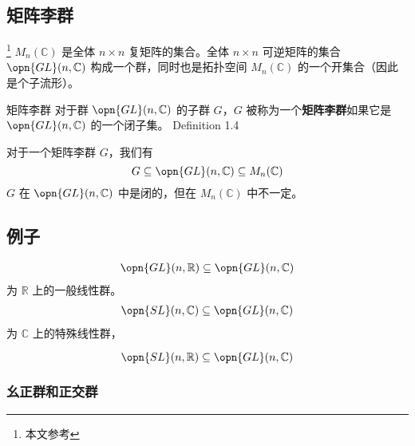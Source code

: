 
\begin{issues}
\issueDraft
\end{issues}


\subsection{矩阵李群}

\footnote{本文参考\cite{GTM222}} $M_n(\mathbb{C})$ 是全体 $n \times n$ 复矩阵的集合。全体 $n \times n$ 可逆矩阵的集合 $\opn{GL}(n, \mathbb{C})$ 构成一个群，同时也是拓扑空间 $M_n(\mathbb{C})$ 的一个开集合（因此是个子流形）。

\begin{definition}{矩阵李群}
对于群 $\opn{GL}(n, \mathbb{C})$ 的子群 $G$，$G$ 被称为一个\textbf{矩阵李群}如果它是 $\opn{GL}(n, \mathbb{C})$ 的一个闭子集。 Definition 1.4 \cite{GTM222} 
\end{definition}

对于一个矩阵李群 $G$，我们有
$$
G \subseteq \opn{GL}(n, \mathbb{C}) \subseteq M_n(\mathbb{C})
$$
$G$ 在 $\opn{GL}(n, \mathbb{C})$ 中是闭的，但在 $M_n(\mathbb{C})$ 中不一定。

\subsection{例子}

\begin{example}{}
\begin{equation}
\begin{aligned}
\opn{GL}(n, \mathbb{R}) \subseteq \opn{GL}(n, \mathbb{C})
\end{aligned}
\end{equation}
为 $\mathbb R$ 上的一般线性群。
\begin{equation}
\begin{aligned}
\opn{SL}(n, \mathbb{C}) \subseteq \opn{GL}(n, \mathbb{C})
\end{aligned}
\end{equation}
为 $\mathbb C$ 上的特殊线性群，

$$\opn{SL}(n, \mathbb{R}) \subseteq \opn{GL}(n, \mathbb{C})$$
\end{example}

\subsubsection{幺正群和正交群}
